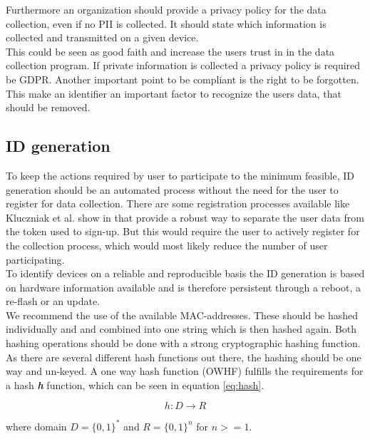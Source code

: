         Furthermore an organization should provide a privacy policy for the data collection, even if no PII is collected. It should state which information is collected and transmitted on a given device.\\
        This could be seen as good faith and increase the users trust in in the data collection program. If private information is collected a privacy policy is required be GDPR. Another important point to be compliant is the right to be forgotten. This make an identifier an important factor to recognize the users data, that should be removed.
        
          
    \subsection{ID generation}
        \label{subsec:software_design:id}
        To keep the actions required by user to participate to the minimum feasible, ID generation should be an automated process without the need for the user to register for data collection. There are some registration processes available like Kluczniak et al. show in \cite{kluczniak_anonymous_2015} that provide a robust way to separate the user data from the token used to sign-up. But this would require the user to actively register for the collection process, which would most likely reduce the number of user participating.\\
        
        To identify devices on a reliable and reproducible basis the ID generation is based on hardware information available and is therefore persistent through a reboot, a re-flash or an update.\\
        We recommend the use of the available MAC-addresses. These should be hashed individually and and combined into one string which is then hashed again. Both hashing operations should be done with a strong cryptographic hashing function.
        As there are several different hash functions out there, the hashing should be one way and un-keyed. A one way hash function (OWHF) fulfills the requirements for a hash \textbf{\textit{h}} function, which can be seen in equation \ref{eq:hash}\cite{sobti_cryptographic_2012}.
        
        \begin{equation}
            \label{eq:hash}
            h : D \longrightarrow R
        \end{equation}
        
        where domain $D = \{0,1\}^*$ and $R=\{0,1\}^n$ for $n >= 1$.
        
